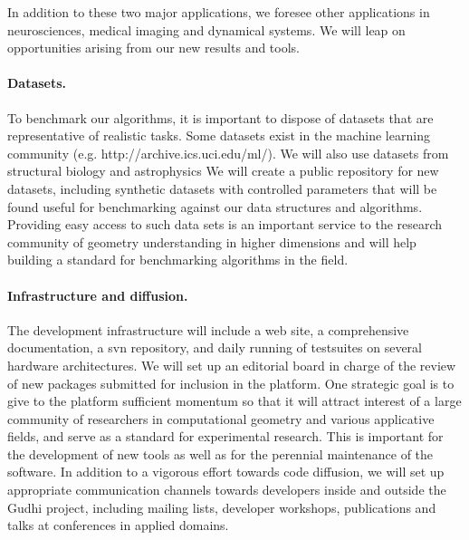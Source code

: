 In addition to these two major applications, we foresee other
applications in neurosciences, medical imaging and dynamical
systems. We will leap on opportunities arising from our new results
and tools.




\paragraph{Datasets.}
To benchmark our algorithms, it is important to dispose of datasets
that are representative of realistic tasks. Some datasets exist in the
machine learning community (e.g. http://archive.ics.uci.edu/ml/). We
will also use datasets from structural biology and astrophysics  We
will create a public repository for new datasets, including synthetic
datasets with controlled parameters that will be found useful for
benchmarking against our data structures and algorithms. Providing easy
access to such data sets is an important service to the research
community of geometry understanding in higher dimensions and will help
building a standard for benchmarking algorithms in the field.


\paragraph{Infrastructure and diffusion.}
The development infrastructure will include a web site, a
comprehensive documentation, a svn repository, and daily running of
testsuites on several hardware architectures.  We will set up an
editorial board in charge of the review of new packages
submitted for inclusion in the platform.  One strategic goal is to
give to the platform sufficient momentum so that it will  attract
interest of a large community of researchers in computational geometry
and various applicative fields, and serve as a standard for
experimental research. This is important for the development of new
tools as well as for the perennial maintenance of the software. In
addition to a vigorous effort towards code diffusion, we will set up
appropriate communication channels towards developers inside and
outside the Gudhi project, including mailing lists, developer
workshops, publications and talks at conferences in applied domains.















